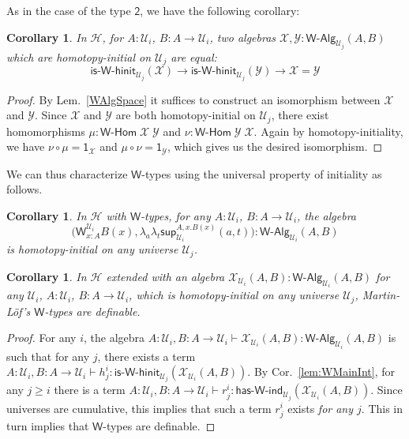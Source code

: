 \documentclass[11pt]{article}
\newcommand{\X}{\mathcal{X}}
\newcommand{\Y}{\mathcal{Y}}
\newcommand{\comp}{\circ}
\newcommand{\lam}[1]{\lambda_{#1}}
\newcommand{\W}{\mathsf{W}}
\newcommand{\wsup}{\mathsf{sup}}
\newcommand{\Bool}{\mathsf{2}}
\newcommand{\one}{\mathsf{1}}
\newcommand{\UU}{\mathcal{U}}
\newcommand{\WAlg}{\mathsf{W}\text{-}\mathsf{Alg}}
\newcommand{\WHom}{\mathsf{W}\text{-}\mathsf{Hom}}
\newcommand{\HasWInd}{\mathsf{has}\text{-}\mathsf{W}\text{-}\mathsf{ind}}
\newcommand{\IsWHInit}{\mathsf{is}\text{-}\mathsf{\W}\text{-}\mathsf{hinit}}
\newcommand{\Hint}{\mathcal{H}}
\newtheorem{corollary}[theorem]{Corollary}
\theoremstyle{definition}
\begin{document}
As in the case of the type $\Bool$, we have the following corollary:
\begin{corollary}\label{WHInitIso}
In $\Hint$, for $A:\UU_i$, $B : A \to \UU_i$, two algebras $\X,\Y : \WAlg_{\UU_j}(A,B)$ which are homotopy-initial on $\UU_j$ are equal:
\[ \IsWHInit_{\UU_j}(\X) \to \IsWHInit_{\UU_j}(\Y) \to \X = \Y\] 
\end{corollary}
\begin{proof}
By Lem.~\ref{WAlgSpace} it suffices to construct an isomorphism between $\X$ and $\Y$. Since $\X$ and $\Y$ are both homotopy-initial on $\UU_j$, there exist homomorphisms $\mu : \WHom \; \X \; \Y$ and $\nu : \WHom \; \Y \; \X$. Again by homotopy-initiality, we have $\nu \comp \mu = \one_\X$ and $\mu \comp \nu = \one_\Y$, which gives us the desired isomorphism.
\end{proof}

We can thus characterize $\W$-types using the universal property of initiality as follows.
\begin{corollary}\label{lem:WInitInt}
In $\Hint$ with $\W$-types, for any $A:\UU_i$, $B : A \to \UU_i$, the algebra \[\Big(\W^{\UU_i}_{x:A}B(x),\lam{a}\lam{t} \wsup_{\UU_i}^{A,x.B(x)}(a,t) \Big) : \WAlg_{\UU_i}(A,B)\] is homotopy-initial on any universe $\UU_j$.
\end{corollary}

\begin{corollary}\label{lem:WCharInt}
In $\Hint$ extended with an algebra $\X_{\UU_i}(A,B) : \WAlg_{\UU_i}(A,B)$ for any $\UU_i$, $A : \UU_i$, $B : A \to \UU_i$, which is homotopy-initial on any universe $\UU_j$, Martin-L{\"o}f's $\W$-types are definable.
\end{corollary}
\begin{proof}
For any $i$, the algebra $A:\UU_i,B:A\to \UU_i \vdash \X_{\UU_i}(A,B) : \WAlg_{\UU_i}(A,B)$ is such that for any $j$, there exists a term $A:\UU_i,B:A\to \UU_i \vdash h^i_j  : \IsWHInit_{\UU_j}(\X_{\UU_i}(A,B))$. By Cor.~\ref{lem:WMainInt}, for any $j \geq i$ there is a term $A:\UU_i,B:A\to \UU_i \vdash r^i_j : \HasWInd_{\UU_j}(\X_{\UU_i}(A,B))$. Since universes are cumulative, this implies that such a term $r^i_j$ exists \emph{for any $j$}. This in turn implies that $\W$-types are definable.
\end{proof}
\end{document}
